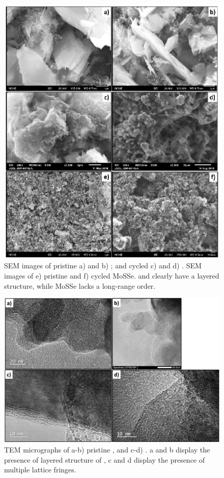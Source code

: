 \begin{figure}[tbh!]
\centering
\includegraphics[width=\textwidth]{Figures/appendix/mox2sem}
\caption{SEM images of pristine a)  and b) ; and cycled c)  and d) . SEM images of e) pristine and f) cycled MoSSe.  and  clearly have a layered structure, while MoSSe lacks a long-range order.}
\label{Figures/appendix:semmox2cnt}
\end{figure}
\begin{figure}[tbh!]
\centering
\includegraphics[width=\textwidth]{Figures/appendix/mox2tem}
\caption{TEM micrographs of a-b) pristine , and c-d) . a and b display the presence of layered structure of , c and d display the presence of multiple lattice fringes.}
\label{Figures/appendix:mox2tem}
\end{figure}
